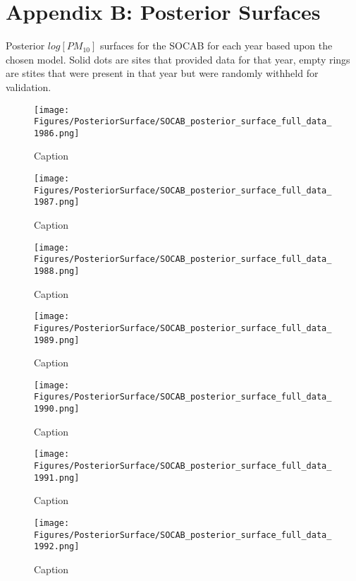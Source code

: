 \section{Appendix B: Posterior Surfaces}
Posterior $log[PM_{10}]$ surfaces for the SOCAB for each year based upon the chosen model.  Solid dots are sites that provided data for that year, empty rings are stites that were present in that year but were randomly withheld for validation.

\begin{figure}
    \centering
    \texttt{[image: Figures/PosteriorSurface/SOCAB\_posterior\_surface\_full\_data\_1986.png]}
    \caption{Caption}
    \label{fig:my_label}
\end{figure}

\begin{figure}
    \centering
    \texttt{[image: Figures/PosteriorSurface/SOCAB\_posterior\_surface\_full\_data\_1987.png]}
    \caption{Caption}
    \label{fig:my_label}
\end{figure}

\begin{figure}
    \centering
    \texttt{[image: Figures/PosteriorSurface/SOCAB\_posterior\_surface\_full\_data\_1988.png]}
    \caption{Caption}
    \label{fig:my_label}
\end{figure}

\begin{figure}
    \centering
    \texttt{[image: Figures/PosteriorSurface/SOCAB\_posterior\_surface\_full\_data\_1989.png]}
    \caption{Caption}
    \label{fig:my_label}
\end{figure}

\begin{figure}
    \centering
    \texttt{[image: Figures/PosteriorSurface/SOCAB\_posterior\_surface\_full\_data\_1990.png]}
    \caption{Caption}
    \label{fig:my_label}
\end{figure}

\begin{figure}
    \centering
    \texttt{[image: Figures/PosteriorSurface/SOCAB\_posterior\_surface\_full\_data\_1991.png]}
    \caption{Caption}
    \label{fig:my_label}
\end{figure}

\begin{figure}
    \centering
    \texttt{[image: Figures/PosteriorSurface/SOCAB\_posterior\_surface\_full\_data\_1992.png]}
    \caption{Caption}
    \label{fig:my_label}
\end{figure}

